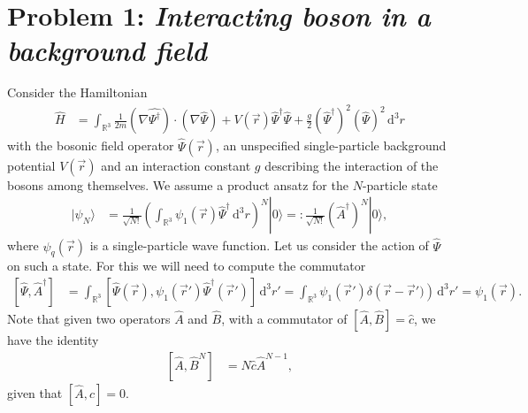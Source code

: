 \documentclass[english, parskip=full]{scrartcl}
\title{\titel}
\author{\autor}
\date{\today}
\newcommand{\intr}{}
\newcommand{\kla}{}
\newcommand{\klam}{}
\newcommand{\Ket}{}
\begin{document}
\maketitle  %

\section*{Problem 1: \normalfont\textit{\large{Interacting boson in a background field}}}
Consider the Hamiltonian
\begin{align}
\hat{H} &= \intr\int_{\mathbb{R}^{3}} \frac{1}{2m} \kla\left( \nabla\hat{\Psi^\dagger} \right)\cdot \kla\left( \nabla\hat{\Psi} \right) + V(\vec{r}) \hat{\Psi}^\dagger \hat{\Psi} + \frac{g}{2}\kla\left( \hat{\Psi}^\dagger \right)^2 \kla\left( \hat{\Psi} \right)^2 \, \mathrm{d}^{3}r
\end{align}
with the bosonic field operator $\hat{\Psi}(\vec{r})$, an unspecified single-particle background potential $V(\vec{r})$ and an interaction constant $g$ describing the interaction of the bosons among themselves.
We assume a product ansatz for the $N$-particle state
\begin{align}
\Ket | \psi_N \rangle &= \frac{1}{\sqrt{N!}} \kla\left( \intr\int_{\mathbb{R}^{3}} \psi_1(\vec{r}) \hat{\Psi}^\dagger \, \mathrm{d}^{3}r \right)^N \Ket | 0 \rangle =: \frac{1}{\sqrt{N!}} \kla\left( \hat{A}^\dagger \right)^N \Ket | 0 \rangle,
\end{align}
where $\psi_q(\vec{r})$ is a single-particle wave function.
Let us consider the action of $\hat{\Psi}$ on such a state.
For this we will need to compute the commutator
\begin{align}
\klam\left[ \hat{\Psi}, \hat{A}^\dagger \right] &= \intr\int_{\mathbb{R}^{3}} \klam\left[ \hat{\Psi}(\vec{r}), \psi_1(\vec{r}') \hat{\Psi}^\dagger (\vec{r}') \right]  \, \mathrm{d}^{3}r' = \intr\int_{\mathbb{R}^{3}} \psi_1(\vec{r}') \delta\kla\left( \vec{r} - \vec{r}') \right) \, \mathrm{d}^{3}r' = \psi_1(\vec{r}).
\end{align}
Note that given two operators $\hat{A}$ and $\hat{B}$, with a commutator of $\klam\left[ \hat{A}, \hat{B} \right] = \hat{c}$, we have the identity
\begin{align}
\klam\left[ \hat{A}, \hat{B}^N \right] &= N\hat{c}\hat{A}^{N-1},
\end{align}
given that $\klam\left[ \hat{A}, \hat{c} \right] = 0$.
\end{document}
